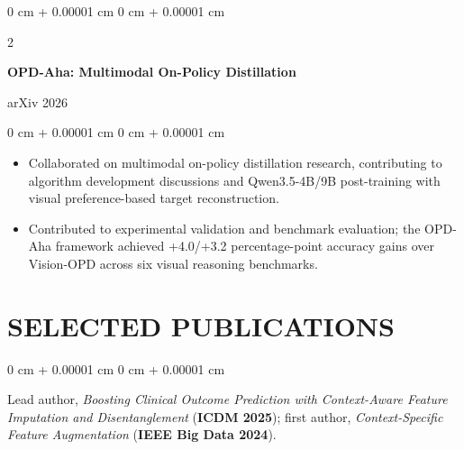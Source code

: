 \documentclass[10pt, letterpaper]{article}
\newenvironment{highlights}{
    \begin{itemize}[
        topsep=0.03 cm,
        parsep=0.03 cm,
        partopsep=0pt,
        itemsep=0pt,
        leftmargin=0 cm + 10pt
    ]
}{
    \end{itemize}
} %
\newenvironment{onecolentry}{
    \begin{adjustwidth}{
        0 cm + 0.00001 cm
    }{
        0 cm + 0.00001 cm
    }
}{
    \end{adjustwidth}
} %
\newenvironment{twocolentry}[2][]{
    \onecolentry
    \def\secondColumn{#2}
    \setcolumnwidth{\fill, 4.5 cm}
    \begin{paracol}{2}
}{
    \switchcolumn \raggedleft \secondColumn
    \end{paracol}
    \endonecolentry
} %
\begin{document}
\begin{twocolentry}{arXiv 2026}
\textbf{OPD-Aha: Multimodal On-Policy Distillation}
\end{twocolentry}
\begin{onecolentry}
\begin{highlights}
\item Collaborated on multimodal on-policy distillation research, contributing to algorithm development discussions and Qwen3.5-4B/9B post-training with visual preference-based target reconstruction.
\item Contributed to experimental validation and benchmark evaluation; the OPD-Aha framework achieved +4.0/+3.2 percentage-point accuracy gains over Vision-OPD across six visual reasoning benchmarks.
\end{highlights}
\end{onecolentry}
\vspace{0.06 cm}
\section{SELECTED PUBLICATIONS}
\begin{onecolentry}
Lead author, \textit{Boosting Clinical Outcome Prediction with Context-Aware Feature Imputation and Disentanglement} (\textbf{ICDM 2025}); first author, \textit{Context-Specific Feature Augmentation} (\textbf{IEEE Big Data 2024}).
\end{onecolentry}
\end{document}
